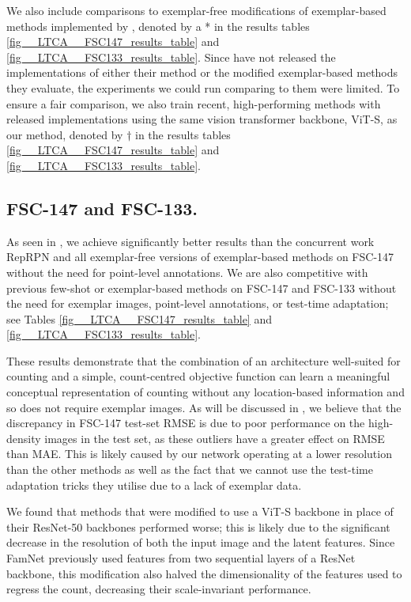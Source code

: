 \documentclass[../thesis.tex]{subfiles}
\begin{document}
We also include comparisons to exemplar-free modifications of exemplar-based methods implemented by \citet{ranjan2022exemplar}, denoted by a * in the results tables \ref{fig__LTCA__FSC147_results_table} and \ref{fig__LTCA__FSC133_results_table}. 
Since \citet{ranjan2022exemplar} have not released the implementations of either their method or the modified exemplar-based methods they evaluate, the experiments we could run comparing to them were limited.
To ensure a fair comparison, we also train recent, high-performing methods with released implementations using the same vision transformer backbone, ViT-S, as our method, denoted by $\dag$ in the results tables \ref{fig__LTCA__FSC147_results_table} and \ref{fig__LTCA__FSC133_results_table}.

\subsection{FSC-147 and FSC-133.}
As seen in , we achieve significantly better results than the concurrent work RepRPN and all exemplar-free versions of exemplar-based methods on FSC-147 without the need for point-level annotations. We are also competitive with previous few-shot or exemplar-based methods on FSC-147 and FSC-133 without the need for exemplar images, point-level annotations, or test-time adaptation; see Tables \ref{fig__LTCA__FSC147_results_table} and \ref{fig__LTCA__FSC133_results_table}. 

These results demonstrate that the combination of an architecture well-suited for counting and a simple, count-centred objective function can learn a meaningful conceptual representation of counting without any location-based information and so does not require exemplar images.
As will be discussed in , we believe that the discrepancy in FSC-147 test-set RMSE is due to poor performance on the high-density images in the test set, as these outliers have a greater effect on RMSE than MAE. 
This is likely caused by our network operating at a lower resolution than the other methods as well as the fact that we cannot use the test-time adaptation tricks they utilise due to a lack of exemplar data.

We found that methods that were modified to use  a ViT-S backbone in place of their ResNet-50 backbones performed worse;
this is likely due to the significant decrease in the resolution of both the input image and the latent features.
Since FamNet previously used features from two sequential layers of a ResNet backbone, this modification also halved the dimensionality of the features used to regress the count, decreasing their scale-invariant performance.
\end{document}
